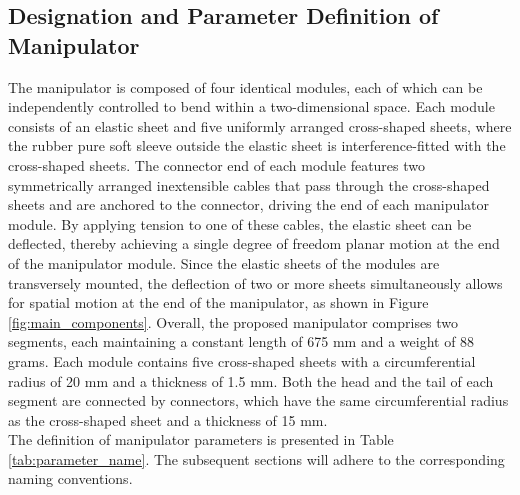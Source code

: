 \subsection{Designation and Parameter Definition of Manipulator}
The manipulator is composed of four identical modules, each of which can be independently controlled to bend within a 
two-dimensional space. Each module consists of an elastic sheet and five uniformly arranged cross-shaped sheets, where 
the rubber pure soft sleeve outside the elastic sheet is interference-fitted with the cross-shaped sheets. The connector 
end of each module features two symmetrically arranged inextensible cables that pass through the cross-shaped sheets and 
are anchored to the connector, driving the end of each manipulator module. By applying tension to one of these cables, 
the elastic sheet can be deflected, thereby achieving a single degree of freedom planar motion at the end of the 
manipulator module. Since the elastic sheets of the modules are transversely mounted, the deflection of two or more 
sheets simultaneously allows for spatial motion at the end of the manipulator, as shown in Figure \ref{fig:main_components}. 
Overall, the proposed manipulator comprises two segments, each maintaining a constant length of 675 mm and a weight of 
88 grams. Each module contains five cross-shaped sheets with a circumferential radius of 20 mm and a thickness of 1.5 mm. 
Both the head and the tail of each segment are connected by connectors, which have the same circumferential radius as 
the cross-shaped sheet and a thickness of 15 mm. \\
The definition of manipulator parameters is presented in Table \ref{tab:parameter_name}. The subsequent sections 
will adhere to the corresponding naming conventions.
